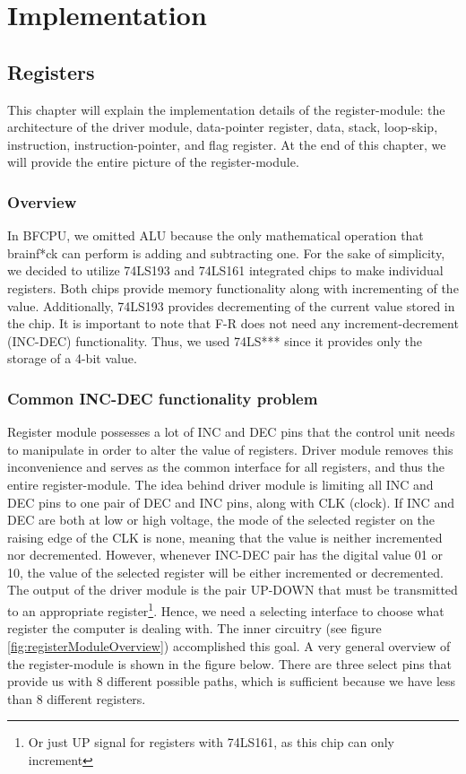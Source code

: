 \section{Implementation} \label{sec:implementation}
\subsection{Registers} \label{sec:implementation:registers}
This chapter will explain the implementation details of the register-module: the architecture of the driver module, data-pointer register, data, stack, loop-skip, instruction, instruction-pointer, and flag register. At the end of this chapter, we will provide the entire picture of the register-module.

\subsubsection{Overview}
In BFCPU, we omitted ALU because the only mathematical operation that brainf*ck can perform is adding and subtracting one. For the sake of simplicity, we decided to utilize 74LS193 and 74LS161 integrated chips to make individual registers. Both chips provide memory functionality along with incrementing of the value. Additionally, 74LS193 provides decrementing of the current value stored in the chip. It is important to note that F-R does not need any increment-decrement (INC-DEC) functionality. Thus, we used 74LS*** since it provides only the storage of a 4-bit value. 

\subsubsection{Common INC-DEC functionality problem}
Register module possesses a lot of INC and DEC pins that the control unit needs to manipulate in order to alter the value of registers. Driver module removes this inconvenience and serves as the common interface for all registers, and thus the entire register-module. The idea behind driver module is limiting all INC and DEC pins to one pair of DEC and INC pins, along with CLK (clock). If INC and DEC are both at low or high voltage, the mode of the selected register on the raising edge of the CLK is none, meaning that the value is neither incremented nor decremented. However, whenever INC-DEC pair has the digital value 01 or 10, the value of the selected register will be either incremented or decremented. The output of the driver module is the pair UP-DOWN that must be transmitted to an appropriate register\footnote{Or just UP signal for registers with 74LS161, as this chip can only increment}. Hence, we need a selecting interface to choose what register the computer is dealing with. The inner circuitry (see figure \ref{fig:registerModuleOverview}) accomplished this goal. A very general overview of the register-module is shown in the figure below. There are three select pins that provide us with 8 different possible paths, which is sufficient because we have less than 8 different registers.

